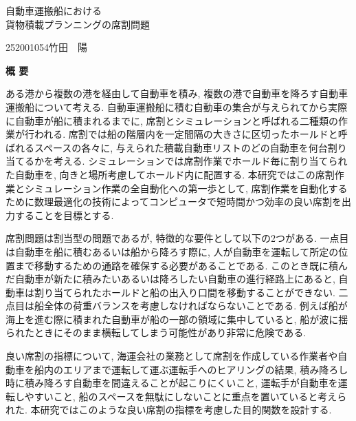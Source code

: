 \begin{center}
{\LARGE 自動車運搬船における \\ 貨物積載プランニングの席割問題}\\[0.5cm]
\end{center}
\hfill
{\large 252001054\qquad 竹田　陽}\\[0.5cm]
\begin{center}
{\Large \bf 概 要}\\
\end{center}

ある港から複数の港を経由して自動車を積み, 複数の港で自動車を降ろす自動車運搬船について考える. 自動車運搬船に積む自動車の集合が与えられてから実際に自動車が船に積まれるまでに, 席割とシミュレーションと呼ばれる二種類の作業が行われる. 席割では船の階層内を一定間隔の大きさに区切ったホールドと呼ばれるスペースの各々に, 与えられた積載自動車リストのどの自動車を何台割り当てるかを考える. シミュレーションでは席割作業でホールド毎に割り当てられた自動車を, 向きと場所考慮してホールド内に配置する. 本研究ではこの席割作業とシミュレーション作業の全自動化への第一歩として, 席割作業を自動化するために数理最適化の技術によってコンピュータで短時間かつ効率の良い席割を出力することを目標とする.

席割問題は割当型の問題であるが, 特徴的な要件として以下の2つがある. 一点目は自動車を船に積むあるいは船から降ろす際に, 人が自動車を運転して所定の位置まで移動するための通路を確保する必要があることである. このとき既に積んだ自動車が新たに積みたいあるいは降ろしたい自動車の進行経路上にあると, 自動車は割り当てられたホールドと船の出入り口間を移動することができない. 二点目は船全体の荷重バランスを考慮しなければならないことである. 例えば船が海上を進む際に積まれた自動車が船の一部の領域に集中していると, 船が波に揺られたときにそのまま横転してしまう可能性があり非常に危険である.

良い席割の指標について, 海運会社の業務として席割を作成している作業者や自動車を船内のエリアまで運転して運ぶ運転手へのヒアリングの結果, 積み降ろし時に積み降ろす自動車を間違えることが起こりにくいこと, 運転手が自動車を運転しやすいこと, 船のスペースを無駄にしないことに重点を置いていると考えられた. 本研究ではこのような良い席割の指標を考慮した目的関数を設計する. 
